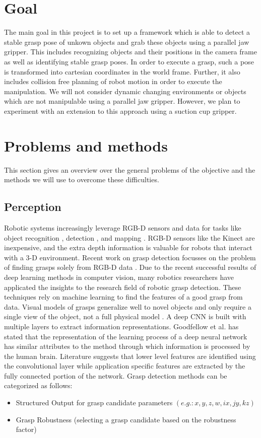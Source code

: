 \documentclass[a4paper]{article}
\begin{document}
\section{Goal} 
\label{2sec_goal}
The main goal in this project is to set up a framework which is able to detect a stable grasp pose of unkown objects and grab these objects using a parallel jaw gripper.
This includes recognizing objects and their positions in the camera frame as well as identifying stable grasp poses.
In order to execute a grasp, such a pose is transformed into cartesian coordinates in the world frame.
Further, it also includes collision free planning of robot motion in order to execute the manipulation.
We will not consider dynamic changing environments or objects which are not manipulable using a parallel jaw gripper. 
However, we plan to experiment with an extension to this approach using a suction cup gripper.

\section{Problems and methods}
\label{3sec_prob_n_meth}
This section gives an overview over the general problems of the objective and the methods we will use to overcome these difficulties.

\subsection{Perception}
\label{3_1subsec_perception}
Robotic systems increasingly leverage RGB-D sensors and data for tasks like object recognition \cite{8_lai2011large}, detection \cite{9_lai2012detection}, and mapping \cite{11_du2011rgb}. 
RGB-D sensors like the Kinect are inexpensive, and the extra depth information is valuable for robots that interact with a 3-D environment.
Recent work on grasp detection focusses on the problem of finding grasps solely from RGB-D data \cite{13_saxena2008robotic}. 
Due to the recent successful results of deep learning methods in computer vision, many robotics researchers have applicated the insights to the research field of robotic grasp detection.
These techniques rely on machine learning to find the features of a good grasp from data. 
Visual models of grasps generalize well to novel objects and only require a single view of the object, not a full physical model \cite{18_erhan2014scalable}.
A deep CNN is built with multiple layers to extract information representations.
Goodfellow et al. \cite{goodfellow2016deep} has stated that the representation of the learning process of a deep neural network has similar attributes to the method through which information is processed by the human brain. 
Literature suggests that lower level features are identified using the convolutional layer while application specific features are extracted by the fully connected portion of the network.
Grasp detection methods can be categorized as follows:
\begin{itemize}
    \item Structured Output for grasp candidate parameters $(e.g.: x, y, z, w, ix, jy, kz)$
    \item Grasp Robustness (selecting a grasp candidate based on the robustness factor)
\end{itemize}
\end{document}
